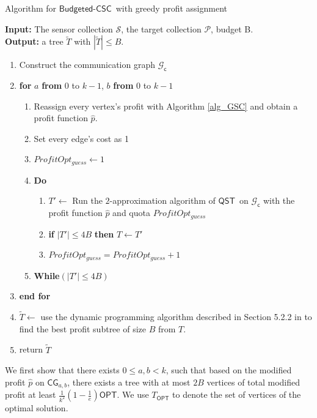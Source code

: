 \documentclass[11pt]{article}
\newcommand{\calP}{{\mathcal P}}
\newcommand{\calS}{{\mathcal S}}
\newcommand{\OPT}{\mathsf{OPT}}
\newcommand{\hp}{\widehat{p}}
\newcommand{\rednote}[1]{#1}
\newcommand{\bcsc}{$\mathsf{Budgeted}$-$\mathsf{CSC}$}
\newcommand{\qst}{$\mathsf{QST}$}
\newcommand{\cells}{\mathsf{CG}}
\newcommand{\Gc}{\mathcal{G}_\mathsf{c}}
\begin{document}
\begin{algorithm}
	\label{alg_gppafb}
	\caption{Algorithm for \bcsc\ with greedy profit assignment}
	\textbf{Input:} The sensor collection $\calS$, the target collection $\calP$, budget B. \\
	\textbf{Output:} a tree $\tilde{T}$ with $|\tilde{T}|\leq B $.
	\begin{enumerate}
		\item Construct the communication graph $\Gc$	
		\item \textbf{for} $a$ \textbf{from} $0$ to $k-1$, $b$ \textbf{from} $0$ to $k-1$
		\begin{enumerate}
			\item Reassign every vertex's profit with Algorithm \ref{alg_GSC} \rednote{and obtain a profit function $\hat{p}$}.
			\item Set every edge's cost as 1
			\item $ProfitOpt_{guess} \gets 1$
			\item \textbf{Do}
			\begin{enumerate}
				\item $T' \gets$ Run the $2$-approximation algorithm of \qst\ on $\Gc$ \rednote{with the profit function $\hat{p}$} and quota $ProfitOpt_{guess}$
				\item \textbf{if} $|T'| \leq 4B$ \textbf{then} $T \gets T'$
				\item $ProfitOpt_{guess} = ProfitOpt_{guess} + 1$
			\end{enumerate}
			\item \textbf{While}$(|T'| \leq 4B)$		
		\end{enumerate}			
		\item \textbf{end for}
		\item $\tilde{T} \gets $ use the dynamic programming algorithm described in Section 5.2.2 in \cite{khuller2014analyzing} to find the best profit subtree of size $B$ from $T$.
		\item return $\tilde{T}$	
	\end{enumerate}
\end{algorithm}

We first show that there exists $0\leq a,b <k$, such that based on the modified profit $\hp$ on $\cells_{a,b}$,
there exists a tree with at most $2B$ vertices of total modified profit at least
$\frac{1}{k^2}\left(1-\frac{1}{e}\right)\OPT$.
We use $T_{\OPT}$ to denote the set of vertices of the optimal solution.
\end{document}
